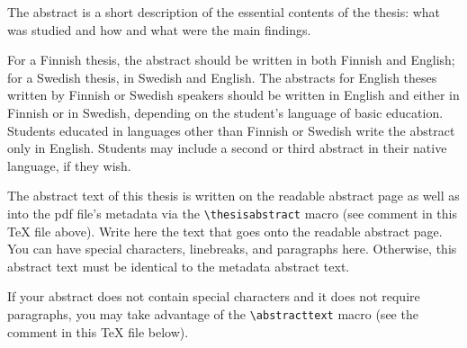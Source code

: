 \documentclass[english, 12pt, a4paper, sci, utf8, a-2b, online]{aaltothesis}
\date{9 February 2023}
\theoremstyle{definition}
\theoremstyle{plain}
\numberwithin{equation}{section}
\begin{document}
\makecoverpage

\makecopyrightpage

\clearpage

\begin{abstractpage}[english]
  The abstract is a short description of the essential contents of the thesis:
  what was studied and how and what were the main findings.

  For a Finnish thesis, the abstract should be written in both Finnish and
  English; for a Swedish thesis, in Swedish and English. The abstracts for
  English theses written by Finnish or Swedish speakers should be written in
  English and either in Finnish or in Swedish, depending on the student’s
  language of basic education. Students educated in languages other than Finnish
  or Swedish write the abstract only in English. Students may include a second
  or third abstract in their native language, if they wish.

  The abstract text of this thesis is written on the readable abstract page as
  well as into the pdf file's metadata via the \verb+\thesisabstract+ macro
  (see comment in this \TeX{} file above). Write here the text that goes onto
  the readable abstract page. You can have special characters, linebreaks, and
  paragraphs here. Otherwise, this abstract text must be identical to the
  metadata abstract text.
  
  If your abstract does not contain special characters and it does not require
  paragraphs, you may take advantage of the \verb+\abstracttext+ macro (see the
  comment in this \TeX{} file below).
\end{abstractpage}

\end{document}
